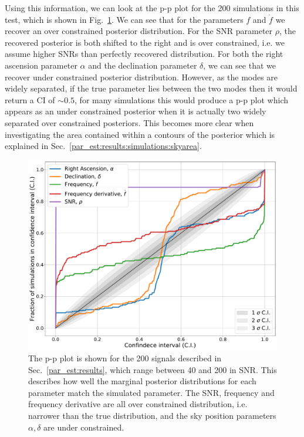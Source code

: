 Using this information, we can look at the p-p plot for the 200 simulations in this test, which is shown in Fig.~\ref{par_est:results:ppplot}.
We can see that for the parameters $f$ and $\dot{f}$ we recover an over constrained posterior distribution.
For the \gls{SNR} parameter $\rho$, the recovered posterior is both shifted to the right and is over constrained, i.e. we assume higher \glspl{SNR} than perfectly recovered distribution.
For both the right ascension parameter $\alpha$ and the declination parameter $\delta$, we can see that we recover under constrained posterior distribution.
However, as the modes are widely separated, if the true parameter lies between the two modes then it would return a \gls{CI} of $\sim 0.5$, for many simulations this would produce a p-p plot which appears as an under constrained posterior when it is actually two widely separated over constrained posteriors.
This becomes more clear when investigating the area contained within a contours of the posterior which is explained in Sec.~\ref{par_est:results:simulations:skyarea}.
%
\begin{figure}[ht]
    \centering
    \includegraphics[width=\linewidth]{C5_parameter/ppplot.pdf}
    \caption[p-p plot for the CW simulations]{The p-p plot is shown for the 200 signals described in Sec.~\ref{par_est:results}, which range between 40 and 200 in \gls{SNR}. This describes how well the marginal posterior distributions for each parameter match the simulated parameter. The \gls{SNR}, frequency and frequency derivative are all over constrained distribution, i.e. narrower than the true distribution, and the sky position parameters $\alpha,\delta$ are under constrained.}
    \label{par_est:results:ppplot}
\end{figure}

